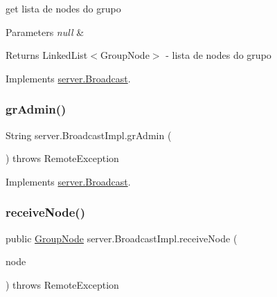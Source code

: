 get lista de nodes do grupo 


\begin{DoxyParams}{Parameters}
{\em null} & \\
\hline
\end{DoxyParams}
\begin{DoxyReturn}{Returns}
Linked\+List$<$\+Group\+Node$>$ -\/ lista de nodes do grupo 
\end{DoxyReturn}


Implements \hyperlink{interfaceserver_1_1_broadcast_af8619fab19094de9cbc3e0b4d34eca7e}{server.\+Broadcast}.

\mbox{\label{classserver_1_1_broadcast_impl_ae5995f5346d95cdbcd02361f10158671}} 
\subsubsection{\texorpdfstring{gr\+Admin()}{grAdmin()}}
{\footnotesize\ttfamily String server.\+Broadcast\+Impl.\+gr\+Admin (\begin{DoxyParamCaption}{ }\end{DoxyParamCaption}) throws Remote\+Exception}



Implements \hyperlink{interfaceserver_1_1_broadcast_ad17b53d0030a03ab8262ec9c94d19cdb}{server.\+Broadcast}.

\mbox{\label{classserver_1_1_broadcast_impl_a15437fb9a1caea537b29d0ded4809e32}} 
\subsubsection{\texorpdfstring{receive\+Node()}{receiveNode()}}
{\footnotesize\ttfamily public \hyperlink{classstructure_1_1_group_node}{Group\+Node} server.\+Broadcast\+Impl.\+receive\+Node (\begin{DoxyParamCaption}\item[{\hyperlink{classstructure_1_1_group_node}{Group\+Node}}]{node }\end{DoxyParamCaption}) throws Remote\+Exception}



